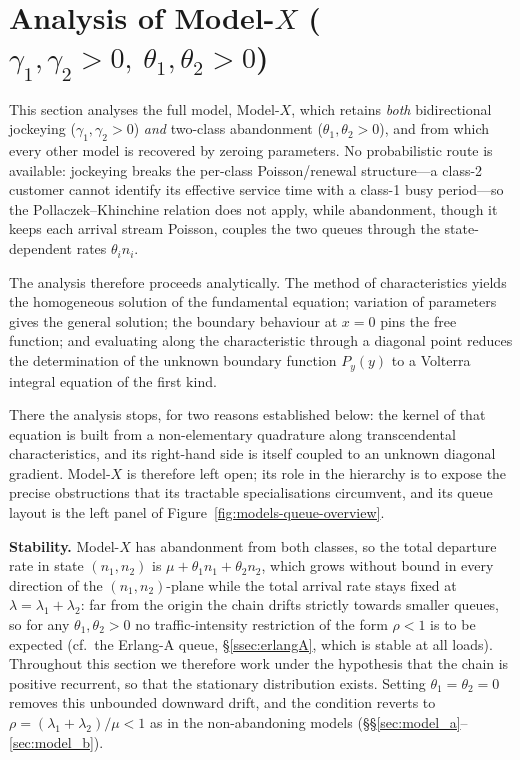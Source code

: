 \section{Analysis of Model-\texorpdfstring{$X$}{X} (\texorpdfstring{$\gamma_1,\gamma_2>0,\ \theta_1,\theta_2>0$}{gamma1,gamma2>0, theta1,theta2>0})}\label{sec:model_x_anal}

This section analyses the full model, Model-$X$, which retains \emph{both} bidirectional
jockeying ($\gamma_1,\gamma_2>0$) \emph{and} two-class abandonment
($\theta_1,\theta_2>0$), and from which every other model is recovered by
zeroing parameters. No probabilistic route is available: jockeying breaks the per-class
Poisson/renewal structure---a class-2 customer cannot identify its effective service time
with a class-1 busy period---so the Pollaczek--Khinchine relation does not apply, while
abandonment, though it keeps each arrival stream Poisson, couples the two queues through
the state-dependent rates $\theta_i n_i$.

The analysis therefore proceeds analytically. The method of characteristics yields the
homogeneous solution of the fundamental equation; variation of parameters gives the
general solution; the boundary behaviour at $x=0$ pins the free function; and evaluating
along the characteristic through a diagonal point reduces the determination of the unknown
boundary function $P_y(y)$ to a Volterra integral equation of the first kind.

There the analysis stops, for two reasons established below: the kernel of that equation
is built from a non-elementary quadrature along transcendental characteristics, and its
right-hand side is itself coupled to an unknown diagonal gradient. Model-$X$ is therefore
left open; its role in the hierarchy is to expose the precise obstructions that its
tractable specialisations circumvent, and its queue layout is the left panel of
Figure~\ref{fig:models-queue-overview}.

\textbf{Stability.} Model-$X$ has abandonment from both classes, so the total departure
rate in state $(n_1,n_2)$ is $\mu+\theta_1 n_1+\theta_2 n_2$, which grows without bound
in every direction of the $(n_1,n_2)$-plane while the total arrival rate stays fixed at
$\lambda=\lambda_1+\lambda_2$: far from the origin the chain drifts strictly towards
smaller queues, so for any $\theta_1,\theta_2>0$ no traffic-intensity restriction of the
form $\rho<1$ is to be expected (cf.\ the Erlang-A queue, \S\ref{ssec:erlangA}, which is
stable at all loads). Throughout this section we therefore work under the hypothesis
that the chain is positive recurrent, so that the stationary distribution exists.
Setting $\theta_1=\theta_2=0$ removes this unbounded downward
drift, and the condition reverts to $\rho=(\lambda_1+\lambda_2)/\mu<1$ as in the
non-abandoning models (\S\S\ref{sec:model_a}--\ref{sec:model_b}).

